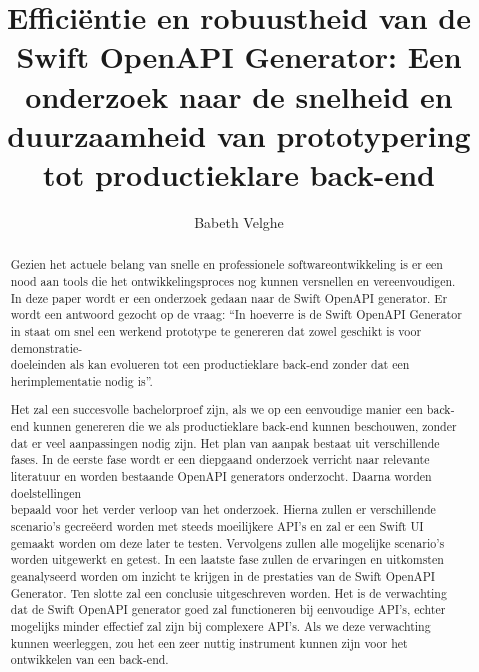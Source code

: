 \documentclass{hogent-article}
\title{Efficiëntie en robuustheid van de Swift OpenAPI Generator: Een onderzoek naar de snelheid en duurzaamheid van prototypering tot productieklare back-end}
\author{Babeth Velghe}
\begin{document}
\begin{abstract}
  Gezien het actuele belang van snelle en professionele softwareontwikkeling is er een nood aan tools die het ontwikkelingsproces nog kunnen versnellen en vereenvoudigen. In deze paper wordt er een onderzoek gedaan naar de Swift OpenAPI generator. Er wordt een antwoord gezocht op de vraag: “In hoeverre is de Swift OpenAPI Generator in staat om snel een werkend prototype te genereren dat zowel geschikt is voor demonstratie-\\doeleinden als kan evolueren tot een productieklare back-end zonder dat een herimplementatie nodig is”. 
  
  Het zal een succesvolle bachelorproef zijn, als we op een eenvoudige manier een back-end kunnen genereren die we als productieklare back-end kunnen beschouwen, zonder dat er veel aanpassingen nodig zijn.
  Het plan van aanpak bestaat uit verschillende fases. In de eerste fase wordt er een diepgaand onderzoek verricht naar relevante literatuur en worden bestaande OpenAPI generators onderzocht. Daarna worden doelstellingen \\bepaald voor het verder verloop van het onderzoek. Hierna zullen er verschillende scenario’s gecreëerd worden met steeds moeilijkere API’s en zal er een Swift UI gemaakt worden om deze later te testen. Vervolgens zullen alle mogelijke scenario’s worden uitgewerkt en getest. In een laatste fase zullen de ervaringen en uitkomsten geanalyseerd worden om inzicht te krijgen in de prestaties van de Swift OpenAPI Generator. Ten slotte zal een conclusie uitgeschreven worden.
  Het is de verwachting dat de Swift OpenAPI generator goed zal functioneren bij eenvoudige API's, echter mogelijks minder effectief zal zijn bij complexere API's. Als we deze verwachting kunnen weerleggen, zou het een zeer nuttig instrument kunnen zijn voor het ontwikkelen van een back-end.
  
  
\end{abstract}

\tableofcontents



\printbibliography[heading=bibintoc]
\end{document}
